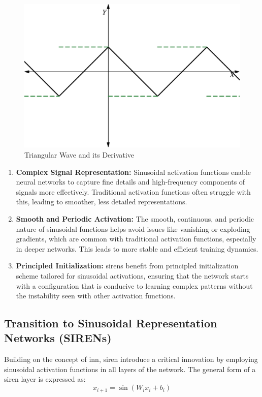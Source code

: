 \documentclass{ioereport}
\begin{document}
    \begin{figure}[H]
        \centering
        \includegraphics[height=0.25\textheight]{assets/triangular-wave.png}
        \caption{Triangular Wave and its Derivative}
        \label{fig:triangular wave}
    \end{figure}
    
    
    \begin{enumerate}[label=\textbf{\roman*.}]
        \item \textbf{Complex Signal Representation:} Sinusoidal activation functions enable neural networks to capture fine details and high-frequency components of signals more effectively. Traditional activation functions often struggle with this, leading to smoother, less detailed representations.
        \item \textbf{Smooth and Periodic Activation:} The smooth, continuous, and periodic nature of sinusoidal functions helps avoid issues like vanishing or exploding gradients, which are common with traditional activation functions, especially in deeper networks. This leads to more stable and efficient training dynamics.
        \item \textbf{Principled Initialization:} \gls{siren}s benefit from principled initialization scheme tailored for sinusoidal activations, ensuring that the network starts with a configuration that is conducive to learning complex patterns without the instability seen with other activation functions.
    \end{enumerate}
    
    \subsection{Transition to Sinusoidal Representation Networks (SIRENs)}
    Building on the concept of \gls{inn}, \gls{siren} introduce a critical innovation by employing sinusoidal activation functions in all layers of the network. The general form of a \gls{siren} layer is expressed as:
    \begin{equation}
        x_{i+1} = \sin(W_i x_i + b_i)
    \end{equation}
    
\end{document}
